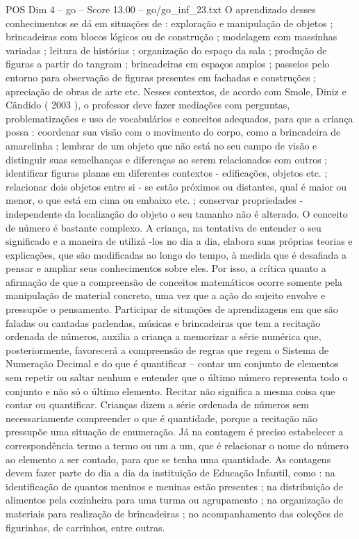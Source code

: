 \begin{textsample}{POS Dim 4 – go – Score 13.00 – go/go\_inf\_23.txt}
O aprendizado desses conhecimentos se dá em situações de : exploração e manipulação de objetos ; brincadeiras com blocos lógicos ou de construção ; modelagem com massinhas variadas ; leitura de histórias ; organização do espaço da sala ; produção de figuras a partir do tangram ; brincadeiras em espaços amplos ; passeios pelo entorno para observação de figuras presentes em fachadas e construções ; apreciação de obras de arte etc.
Nesses contextos, de acordo com Smole, Diniz e Cândido ( 2003 ), o professor deve fazer mediações com perguntas, problematizações e uso de vocabulários e conceitos adequados, para que a criança possa : coordenar sua visão com o movimento do corpo, como a brincadeira de amarelinha ; lembrar de um objeto que não está no seu campo de visão e distinguir suas semelhanças e diferenças ao serem relacionados com outros ; identificar figuras planas em diferentes contextos - edificações, objetos etc. ; relacionar dois objetos entre si - se estão próximos ou distantes, qual é maior ou menor, o que está em cima ou embaixo etc. ; conservar propriedades - independente da localização do objeto o seu tamanho não é alterado.
O conceito de número é bastante complexo.
A criança, na tentativa de entender o seu significado e a maneira de utilizá -los no dia a dia, elabora suas próprias teorias e explicações, que são modificadas ao longo do tempo, à medida que é desafiada a pensar e ampliar seus conhecimentos sobre eles.
Por isso, a crítica quanto a afirmação de que a compreensão de conceitos matemáticos ocorre somente pela manipulação de material concreto, uma vez que a ação do sujeito envolve e pressupõe o pensamento.
Participar de situações de aprendizagens em que são faladas ou cantadas parlendas, músicas e brincadeiras que tem a recitação ordenada de números, auxilia a criança a memorizar a série numérica que, posteriormente, favorecerá a compreensão de regras que regem o Sistema de Numeração Decimal e do que é quantificar – contar um conjunto de elementos sem repetir ou saltar nenhum e entender que o último número representa todo o conjunto e não só o último elemento.
Recitar não significa a mesma coisa que contar ou quantificar.
Crianças dizem a série ordenada de números sem necessariamente compreender o que é quantidade, porque a recitação não pressupõe uma situação de enumeração.
Já na contagem é preciso estabelecer a correspondência termo a termo ou um a um, que é relacionar o nome do número ao elemento a ser contado, para que se tenha uma quantidade.
As contagens devem fazer parte do dia a dia da instituição de Educação Infantil, como : na identificação de quantos meninos e meninas estão presentes ; na distribuição de alimentos pela cozinheira para uma turma ou agrupamento ; na organização de materiais para realização de brincadeiras ; no acompanhamento das coleções de figurinhas, de carrinhos, entre outras.

\end{textsample}
